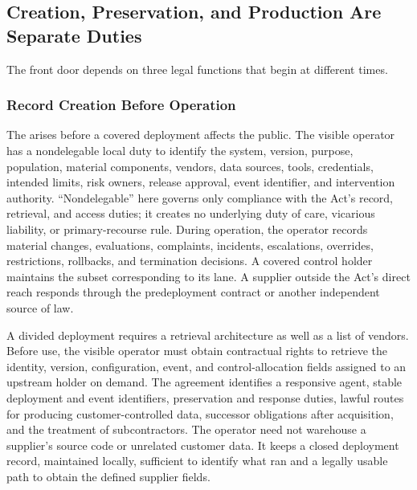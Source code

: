 \subsection{Creation, Preservation, and Production Are Separate Duties}
\label{sec:three-duties}

The front door depends on three legal functions that begin at different times.

\subsubsection{Record Creation Before Operation}

The  arises before a covered deployment affects the public. The visible operator has a nondelegable local duty to identify the system, version, purpose, population, material components, vendors, data sources, tools, credentials, intended limits, risk owners, release approval, event identifier, and intervention authority. ``Nondelegable'' here governs only compliance with the Act's record, retrieval, and access duties; it creates no underlying duty of care, vicarious liability, or primary-recourse rule. During operation, the operator records material changes, evaluations, complaints, incidents, escalations, overrides, restrictions, rollbacks, and termination decisions. A covered control holder maintains the subset corresponding to its lane. A supplier outside the Act's direct reach responds through the predeployment contract or another independent source of law.

A divided deployment requires a retrieval architecture as well as a list of vendors. Before use, the visible operator must obtain contractual rights to retrieve the identity, version, configuration, event, and control-allocation fields assigned to an upstream holder on demand. The agreement identifies a responsive agent, stable deployment and event identifiers, preservation and response duties, lawful routes for producing customer-controlled data, successor obligations after acquisition, and the treatment of subcontractors. The operator need not warehouse a supplier's source code or unrelated customer data. It keeps a closed deployment record, maintained locally, sufficient to identify what ran and a legally usable path to obtain the defined supplier fields.

